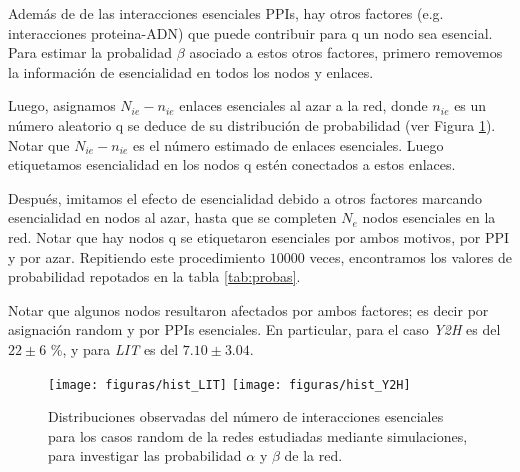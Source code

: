 Adem\'as de de las interacciones esenciales PPIs, hay otros factores (e.g. interacciones proteina-ADN) que puede contribuir para q un nodo sea esencial.
Para estimar la probalidad $\beta$ asociado a estos otros factores, primero removemos la informaci\'on de esencialidad en todos los nodos y enlaces.

Luego, asignamos $N_{ie} - n_{ie}$ enlaces esenciales al azar a la red, donde $n_{ie}$ es un n\'umero aleatorio q se deduce de su distribuci\'on de probabilidad (ver Figura \ref{fig:hist_simulaciones}).
Notar que $N_{ie}-n_{ie}$ es el n\'umero estimado de enlaces esenciales.
Luego etiquetamos esencialidad en los nodos q est\'en conectados a estos enlaces.

Despu\'es, imitamos el efecto de esencialidad debido a otros factores marcando esencialidad en nodos al azar, hasta que se completen $N_e$ nodos esenciales en la red.
Notar que hay nodos q se etiquetaron esenciales por ambos motivos, por PPI y por azar.
Repitiendo este procedimiento $10000$ veces, encontramos los valores de probabilidad repotados en la tabla \ref{tab:probas}.


Notar que algunos nodos resultaron afectados por ambos factores; es decir por asignaci\'on random y por PPIs esenciales. 
En particular, para el caso {\it Y2H} es del $22 \pm 6$ \%, y para {\it LIT} es del $7.10 \pm 3.04$.

\begin{figure}
\centering
\texttt{[image: figuras/hist\_LIT]} 
\texttt{[image: figuras/hist\_Y2H]} \\
\caption{Distribuciones observadas del n\'umero de interacciones esenciales para los casos random de la redes estudiadas mediante simulaciones, para investigar las probabilidad $\alpha$ y $\beta$ de la red.}
\label{fig:hist_simulaciones}
\end{figure}

